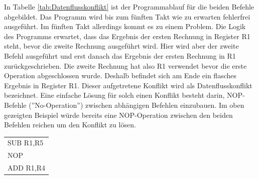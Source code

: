 \documentclass[a4paper,12pt]{article}
\begin{document}
\noindent In Tabelle \ref{tab:Datenflusskonflikt} ist der Programmablauf für die beiden Befehle abgebildet. Das Programm wird bis zum fünften Takt wie zu erwarten fehlerfrei ausgeführt. Im fünften Takt allerdings kommt es zu einem Problem. Die Logik des Programms erwartet, dass das Ergebnis der ersten Rechnung in Register R1 steht, bevor die zweite Rechnung ausgeführt wird. Hier wird aber der zweite Befehl ausgeführt und erst danach das Ergebnis der ersten Rechnung in R1 zurückgeschrieben. Die zweite Rechnung hat also R1 verwendet bevor die erste Operation abgeschlossen wurde. Deshalb befindet sich am Ende ein flasches Ergebnis in Register R1. Dieser aufgetretene Konflikt wird als Datenflusskonflikt bezeichnet. Eine einfache Lösung für solch einen Konflikt besteht darin, NOP-Befehle (''No-Operation'') zwischen abhängigen Befehlen einzubauen. Im oben gezeigten Beispiel würde bereits eine NOP-Operation zwischen den beiden Befehlen reichen um den Konflikt zu lösen.


\begin{table}[!htb]
\centering
\begin{tabular}{l}
SUB R1,R5 \\
NOP       \\
ADD R1,R4
\end{tabular}
\end{table}
\end{document}

